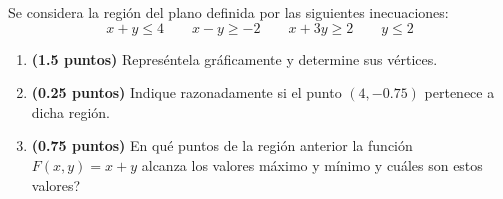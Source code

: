 
Se considera la región del plano definida por las siguientes inecuaciones:
\[
x+y\leq 4\qquad x-y\geq -2\qquad x+3y\geq 2\qquad y\leq 2
\]
\begin{enumerate}[label=\alph*)]
\item \textbf{(1.5 puntos)} Represéntela gráficamente y determine sus vértices.
\item \textbf{(0.25 puntos)} Indique razonadamente si el punto $(4,-0.75)$ pertenece a dicha región.
\item \textbf{(0.75 puntos)} \textquestiondown{}En qué puntos de la región anterior la función $F(x,y)=x+y$ alcanza los valores máximo y mínimo y cuáles son estos valores?
\end{enumerate}
